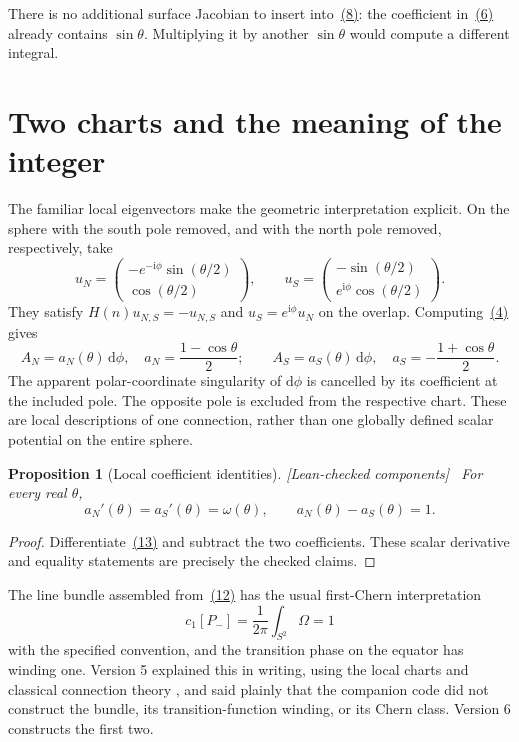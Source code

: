 \documentclass[11pt]{article}
\newtheorem{proposition}[theorem]{Proposition}
\theoremstyle{definition}\newtheorem{definition}[theorem]{Definition}
\theoremstyle{remark}\newtheorem{remark}[theorem]{Remark}
\newcommand{\ii}{\mathrm{i}}
\newcommand{\dd}{\mathrm{d}}
\newcommand{\checked}{\textnormal{\small[Lean-checked components]}\ }
\begin{document}
There is no additional surface Jacobian to insert into~\hyperref[eq:fluxdef]{(8)}: the coefficient in~\hyperref[eq:omega]{(6)} already contains $\sin\theta$. Multiplying it by another $\sin\theta$ would compute a different integral.

\section{Two charts and the meaning of the integer}\label{sec:charts}
The familiar local eigenvectors make the geometric interpretation explicit. On the sphere with the south pole removed, and with the north pole removed, respectively, take
\hypertarget{eq:states}{}
\begin{equation}
 u_N=\begin{pmatrix}-e^{-\ii\phi}\sin(\theta/2)\\\cos(\theta/2)\end{pmatrix},
 \qquad
 u_S=\begin{pmatrix}-\sin(\theta/2)\\e^{\ii\phi}\cos(\theta/2)\end{pmatrix}.
\end{equation}
They satisfy $H(n)u_{N,S}=-u_{N,S}$ and $u_S=e^{\ii\phi}u_N$ on the overlap. Computing~\hyperref[eq:berryconv]{(4)} gives
\hypertarget{eq:charts}{}
\begin{equation}
 A_N=a_N(\theta)\,\dd\phi,\quad a_N=\frac{1-\cos\theta}{2};
 \qquad A_S=a_S(\theta)\,\dd\phi,\quad a_S=-\frac{1+\cos\theta}{2}.
\end{equation}
The apparent polar-coordinate singularity of $\dd\phi$ is cancelled by its coefficient at the included pole. The opposite pole is excluded from the respective chart. These are local descriptions of one connection, rather than one globally defined scalar potential on the entire sphere.

\begin{proposition}[Local coefficient identities]\label{prop:charts}\checked
For every real $\theta$,
\begin{equation}
 a_N'(\theta)=a_S'(\theta)=\omega(\theta),\qquad a_N(\theta)-a_S(\theta)=1.
\end{equation}
\end{proposition}
\begin{proof}
Differentiate~\hyperref[eq:charts]{(13)} and subtract the two coefficients. These scalar derivative and equality statements are precisely the checked claims.
\end{proof}
The line bundle assembled from~\hyperref[eq:states]{(12)} has the usual first-Chern interpretation
\hypertarget{eq:chern}{}
\begin{equation}
 c_1[P_-]=\frac1{2\pi}\int_{S^2}\Omega=1
\end{equation}
with the specified convention, and the transition phase on the equator has winding one. Version 5
explained this in writing, using the local charts and classical connection theory \cite{simon,wuyang},
and said plainly that the companion code did not construct the bundle, its transition-function
winding, or its Chern class. Version 6 constructs the first two.
\end{document}
